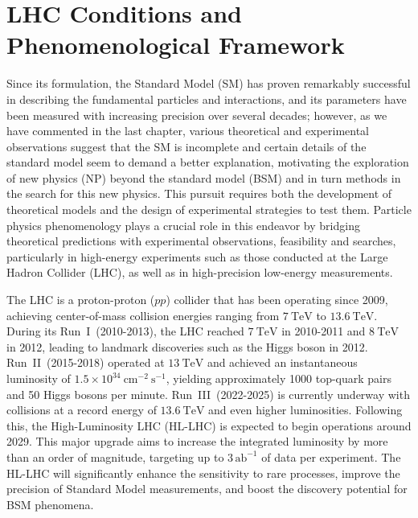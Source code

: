 \chapter{LHC Conditions and Phenomenological Framework}

Since its formulation, the Standard Model (SM) has proven remarkably successful in describing the fundamental particles and interactions, and its parameters have been measured with increasing precision over several decades; however, as we have commented in the last chapter, various theoretical and experimental observations suggest that the SM is incomplete and certain details of the standard model seem to demand a better explanation, motivating the exploration of new physics (NP) beyond the standard model (BSM) and in turn methods in the search for this new physics. This pursuit requires both the development of theoretical models and the design of experimental strategies to test them. Particle physics phenomenology plays a crucial role in this endeavor by bridging theoretical predictions with experimental observations, feasibility and searches, particularly in high-energy experiments such as those conducted at the Large Hadron Collider (LHC), as well as in high-precision low-energy measurements.

The LHC is a proton-proton ($pp$) collider that has been operating since 2009, achieving center-of-mass collision energies ranging from $7~\mathrm{TeV}$ to $13.6~\mathrm{TeV}$. During its Run~I~(2010-2013), the LHC reached $7~\mathrm{TeV}$ in 2010-2011 and $8~\mathrm{TeV}$ in 2012, leading to landmark discoveries such as the Higgs boson in 2012. Run~II~(2015-2018) operated at $13~\mathrm{TeV}$ and achieved an instantaneous luminosity of $1.5 \times 10^{34}~\mathrm{cm}^{-2}~\mathrm{s}^{-1}$, yielding approximately 1000 top-quark pairs and 50 Higgs bosons per minute. Run~III~(2022-2025) is currently underway with collisions at a record energy of $13.6~\mathrm{TeV}$ and even higher luminosities. Following this, the High-Luminosity LHC (HL-LHC) is expected to begin operations around 2029. This major upgrade aims to increase the integrated luminosity by more than an order of magnitude, targeting up to $3\,\mathrm{ab}^{-1}$ of data per experiment. The HL-LHC will significantly enhance the sensitivity to rare processes, improve the precision of Standard Model measurements, and boost the discovery potential for BSM phenomena.

